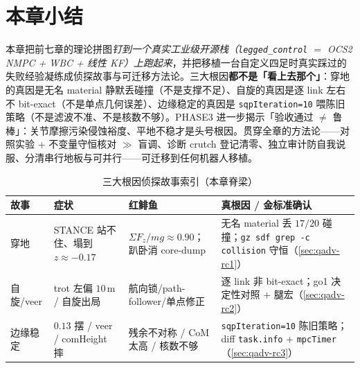 \section*{本章小结}

本章把前七章的理论拼图\emph{钉到一个真实工业级开源栈（\texttt{legged\_control} $=$ OCS2 NMPC + WBC + 线性 KF）上跑起来}，并把移植一台自定义四足时真实踩过的失败经验凝练成侦探故事与可迁移方法论。三大根因\textbf{都不是「看上去那个」}：穿地的真因是无名 material 静默丢碰撞（不是支撑不足）、自旋的真因是逐 link 左右不 bit-exact（不是单点几何误差）、边缘稳定的真因是 \texttt{sqpIteration=10} 喂陈旧策略（不是滤波不准、不是核数不够）。PHASE3 进一步揭示「验收通过 $\neq$ 鲁棒」：关节摩擦污染侵蚀裕度、平地不稳才是头号根因。贯穿全章的方法论——对照实验 + 不变量守恒核对 $\gg$ 盲调、诊断 crutch 登记清零、独立审计防自我说服、分清串行地板与可并行——可迁移到任何机器人移植。

\begin{table}[H]\centering\small
\caption{三大根因侦探故事索引（本章脊梁）}
\begin{tabular}{p{} p{} p{} p{}}
\toprule
故事 & 症状 & 红鲱鱼 & 真根因 / 金标准确认 \\
\midrule
穿地 & STANCE 站不住、塌到 $z{\approx}{-}0.17$ & $\Sigma F_z/mg{\approx}0.90$；趴卧消 core-dump & 无名 material 丢 $17/20$ 碰撞；\texttt{gz sdf grep -c collision} 守恒（\cref{sec:qadv-rc1}）\\
自旋/veer & trot 左偏 $10$\,m / 自旋出局 & 航向锁/path-follower/单点修正 & 逐 link 非 bit-exact；go1 决定性对照 + 腿宏（\cref{sec:qadv-rc2}）\\
边缘稳定 & $0.13$ 摆 / veer / comHeight 摔 & 残余不对称 / CoM 太高 / 核数不够 & \texttt{sqpIteration=10} 陈旧策略；diff \texttt{task.info} + \texttt{mpcTimer}（\cref{sec:qadv-rc3}）\\
\bottomrule
\end{tabular}
\label{tab:qadv-stories}
\end{table}

